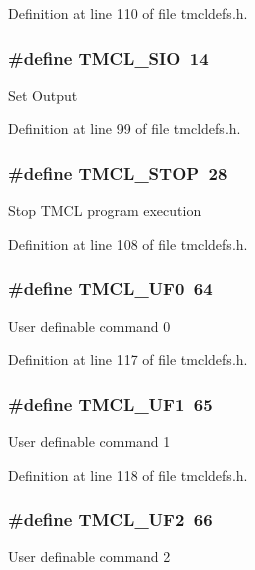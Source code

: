 Definition at line 110 of file tmcldefs.h.\hypertarget{group__TMCLComm_gac92473e5d6624712eb0c6e3b96e72556}{
\subsubsection[{TMCL\_\-SIO}]{\setlength{\rightskip}{0pt plus 5cm}\#define TMCL\_\-SIO~14}}
\label{group__TMCLComm_gac92473e5d6624712eb0c6e3b96e72556}
Set Output 

Definition at line 99 of file tmcldefs.h.\hypertarget{group__TMCLComm_ga85496061c9785e9cc81068564f72d11a}{
\subsubsection[{TMCL\_\-STOP}]{\setlength{\rightskip}{0pt plus 5cm}\#define TMCL\_\-STOP~28}}
\label{group__TMCLComm_ga85496061c9785e9cc81068564f72d11a}
Stop TMCL program execution 

Definition at line 108 of file tmcldefs.h.\hypertarget{group__TMCLComm_ga452f379acd2362b3694cc2332a2ad4c0}{
\subsubsection[{TMCL\_\-UF0}]{\setlength{\rightskip}{0pt plus 5cm}\#define TMCL\_\-UF0~64}}
\label{group__TMCLComm_ga452f379acd2362b3694cc2332a2ad4c0}
User definable command 0 

Definition at line 117 of file tmcldefs.h.\hypertarget{group__TMCLComm_ga04c7b2800e3c01ac91161f7f680ecea0}{
\subsubsection[{TMCL\_\-UF1}]{\setlength{\rightskip}{0pt plus 5cm}\#define TMCL\_\-UF1~65}}
\label{group__TMCLComm_ga04c7b2800e3c01ac91161f7f680ecea0}
User definable command 1 

Definition at line 118 of file tmcldefs.h.\hypertarget{group__TMCLComm_ga91dd885d4a0e3d69623d4323ca1d64df}{
\subsubsection[{TMCL\_\-UF2}]{\setlength{\rightskip}{0pt plus 5cm}\#define TMCL\_\-UF2~66}}
\label{group__TMCLComm_ga91dd885d4a0e3d69623d4323ca1d64df}
User definable command 2 

